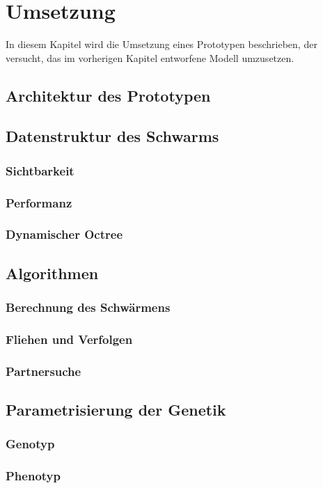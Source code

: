 \documentclass[draft=false
              ,paper=a4
              ,twoside=false
              ,fontsize=11pt
              ,headsepline
              ,BCOR10mm
              ,DIV11
              ,bibtotoc
              ,liststotoc
              ]{scrbook}
\begin{document}
\chapter{Umsetzung}\label{umsetzung}
In diesem Kapitel wird die Umsetzung eines Prototypen beschrieben, der versucht, das im vorherigen Kapitel entworfene Modell umzusetzen.
\section{Architektur des Prototypen}
\section{Datenstruktur des Schwarms}
\subsection{Sichtbarkeit}
\subsection{Performanz}
\subsection{Dynamischer Octree}
\section{Algorithmen}
\subsection{Berechnung des Schwärmens}
\subsection{Fliehen und Verfolgen}
\subsection{Partnersuche}
\section{Parametrisierung der Genetik}
\subsection{Genotyp}
\subsection{Phenotyp}
\end{document}
